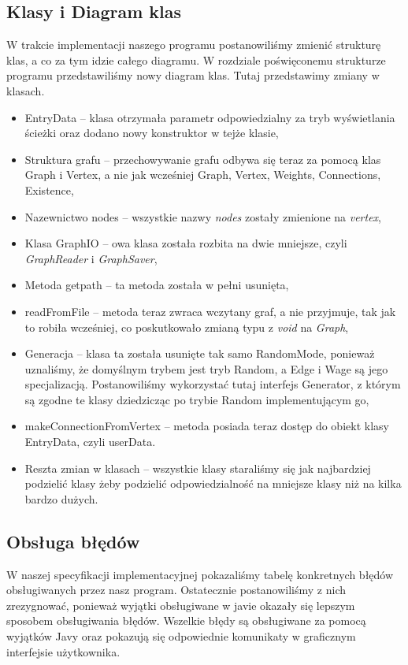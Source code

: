 \documentclass[10pt, a4paper]{report}
\begin{document}
\subsection{Klasy i Diagram klas}\label{subsec:klasy-i-diagram-klas}
W trakcie implementacji naszego programu postanowiliśmy zmienić strukturę klas,
a co za tym idzie całego diagramu. W rozdziale poświęconemu strukturze programu
przedstawiliśmy nowy diagram klas.
Tutaj przedstawimy zmiany w klasach.
\begin{itemize}
  \item EntryData -- klasa otrzymała parametr odpowiedzialny za tryb
        wyświetlania ścieżki oraz dodano nowy konstruktor w tejże klasie,
  \item Struktura grafu -- przechowywanie grafu odbywa się teraz za pomocą klas
        Graph i Vertex, a nie jak wcześniej Graph, Vertex, Weights, Connections,
        Existence,
  \item Nazewnictwo nodes -- wszystkie nazwy \textit{nodes} zostały zmienione
        na \textit{vertex},
  \item Klasa GraphIO -- owa klasa została rozbita na dwie mniejsze, czyli
        \textit{GraphReader} i \textit{GraphSaver},
  \item Metoda getpath -- ta metoda została w pełni usunięta,
  \item readFromFile -- metoda teraz zwraca wczytany graf, a nie przyjmuje, tak
        jak to robiła wcześniej, co poskutkowało zmianą typu z \textit{void} na
        \textit{Graph},
  \item Generacja -- klasa ta została usunięte tak samo RandomMode, ponieważ
        uznaliśmy, że domyślnym trybem jest tryb Random, a Edge i Wage są jego
        specjalizacją. Postanowiliśmy wykorzystać tutaj interfejs Generator, z którym
        są zgodne te klasy dziedzicząc po trybie Random implementującym go,
  \item makeConnectionFromVertex -- metoda posiada teraz dostęp do obiekt klasy
        EntryData, czyli userData.
  \item Reszta zmian w klasach -- wszystkie klasy staraliśmy się jak
        najbardziej podzielić klasy żeby podzielić odpowiedzialność na mniejsze klasy
        niż na kilka bardzo dużych.
\end{itemize}

\subsection{Obsługa błędów}\label{subsec:obsługa-błędów}
W naszej specyfikacji implementacyjnej pokazaliśmy tabelę konkretnych błędów
obsługiwanych przez nasz program. Ostatecznie postanowiliśmy z nich
zrezygnować, ponieważ wyjątki obsługiwane w javie okazały się lepszym
sposobem obsługiwania błędów. Wszelkie błędy są obsługiwane za pomocą wyjątków
Javy oraz pokazują się odpowiednie komunikaty w graficznym interfejsie
użytkownika.
\end{document}
